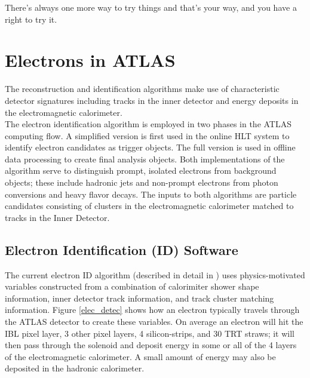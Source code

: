 \begin{savequote}[75mm]
There's always one more way to try things and that's your way, and you have a right to try it.
\end{savequote}

\chapter{Electrons in ATLAS}

 The reconstruction and identification algorithms make use of characteristic detector signatures including tracks in the inner detector and energy deposits in the electromagnetic calorimeter. \\

The electron identification algorithm is employed in two phases in the ATLAS computing flow. A simplified version is first used in the online HLT system to identify electron candidates as trigger objects. The full version is used in offline data processing to create final analysis objects. Both implementations of the algorithm serve to distinguish prompt, isolated electrons from background objects; these include hadronic jets and non-prompt electrons from photon conversions and heavy flavor decays. The inputs to both algorithms are particle candidates consisting of clusters in the electromagnetic calorimeter matched to tracks in the Inner Detector.

\section{Electron Identification (ID) Software}
The current electron ID algorithm (described in detail in \cite{id_note}) uses physics-motivated variables constructed from a combination of calorimiter shower shape information, inner detector track information, and track cluster matching information. Figure \ref{elec_detec} shows how an electron typically travels through the ATLAS detector to create these variables. On average an electron will hit the IBL pixel layer, 3 other pixel layers, 4 silicon-strips, and 30 TRT straws; it will then pass through the solenoid and deposit energy in some or all of the 4 layers of the electromagnetic calorimeter. A small amount of energy may also be deposited in the hadronic calorimeter. \\

